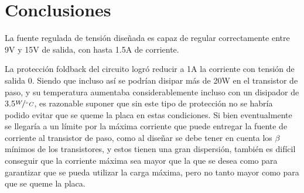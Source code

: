 \documentclass{article}
\begin{document}
\newgeometry{} %


\tableofcontents
\newpage










\section{Conclusiones}

La fuente regulada de tensi\'on dise\~nada es capaz de regular correctamente entre 9V y 15V de salida, con hasta 1.5A de corriente.

La protecci\'on foldback del circuito logr\'o reducir a 1A la corriente con tensi\'on de salida 0. Siendo que incluso as\'i se podr\'ian disipar m\'as de 20W en el transistor de paso, y su temperatura aumentaba considerablemente incluso con un disipador de 3.5$\nicefrac{W}{^\circ C}$,  es razonable suponer que sin este tipo de protecci\'on no se habr\'ia podido evitar que se queme la placa en estas condiciones. Si bien eventualmente se llegar\'ia a un l\'imite por la m\'axima corriente que puede entregar la fuente de corriente al transistor de paso, como al dise\~nar se debe tener en cuenta los $\beta$ m\'inimos de los transistores, y estos tienen una gran dispersi\'on, tambi\'en es dif\'icil conseguir que la corriente m\'axima sea mayor que la que se desea como para garantizar que se pueda utilizar la carga m\'axima, pero no tanto mayor como para que se queme la placa. 

 




\clearpage
\end{document}
